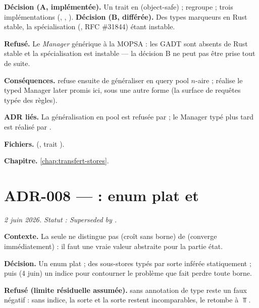 \textbf{Décision (A, implémentée).} Un trait  en
 (object-safe) ;  regroupe
 ; trois implémentations
(, , ).
\textbf{Décision (B, différée).} Des types marqueurs  en
Rust stable, la spécialisation (, RFC
\#31844) étant instable.

\textbf{Refusé.} Le \emph{Manager} générique à la MOPSA : les GADT sont
absents de Rust stable et la spécialisation est instable — la décision B ne
peut pas être prise tout de suite.

\textbf{Conséquences.}  refuse ensuite de généraliser en \og query
pool\fg{} $n$-aire ;  réalise le \og typed Manager later\fg{} promis
ici, sous une autre forme (la surface de requêtes typée des règles).

\textbf{ADR liés.} La généralisation en pool est refusée par  ; le
\og Manager typé plus tard\fg{} est réalisé par .

\textbf{Fichiers.}  (, trait
).

\textbf{Chapitre.} \cref{chap:transfert-stores}.

\section{ADR-008 ---  : enum plat et }
\label{adr:8}
\noindent\textit{2 juin 2026. Statut : Superseded by .}

\textbf{Contexte.} La  seule ne distingue pas
 (croît sans borne) de  (converge
immédiatement) : il faut une vraie valeur abstraite pour la partie état.

\textbf{Décision.} Un enum plat  ; des sous-stores typés par sorte inférée
statiquement ; puis (4 juin) un indice  pour contourner le
problème que  fait perdre toute borne.

\textbf{Refusé (limite résiduelle assumée).}  sans
annotation de type reste un faux négatif : sans indice, la sorte 
et la sorte  restent incomparables, le  retombe à
$\Top$.

